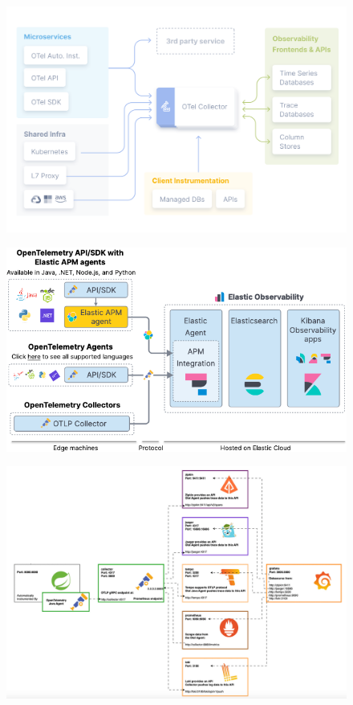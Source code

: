 \documentclass[aspectratio=169]{beamer}
\begin{document}
	\begin{frame}
		\begin{figure}
			\centering
			\includegraphics[width=0.8\linewidth]{Images/otelcollector}
			\label{fig:otelcollector}
		\end{figure}
	\end{frame}
	
	\begin{frame}
		\begin{figure}
			\centering
			\includegraphics[width=0.8\linewidth]{Images/elasticotel}
			\label{fig:elasticotel}
		\end{figure}
	\end{frame}
	
	\begin{frame}
		\begin{figure}
			\centering
			\includegraphics[width=0.8\linewidth]{Images/springboot}
			\label{fig:springboot}
		\end{figure}
	\end{frame}
	
\end{document}

